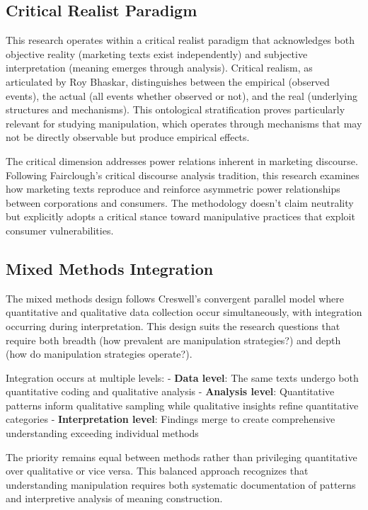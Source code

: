 \subsection{Critical Realist Paradigm}

This research operates within a critical realist paradigm that acknowledges both objective reality (marketing texts exist independently) and subjective interpretation (meaning emerges through analysis). Critical realism, as articulated by Roy Bhaskar, distinguishes between the empirical (observed events), the actual (all events whether observed or not), and the real (underlying structures and mechanisms). This ontological stratification proves particularly relevant for studying manipulation, which operates through mechanisms that may not be directly observable but produce empirical effects.

The critical dimension addresses power relations inherent in marketing discourse. Following Fairclough's critical discourse analysis tradition, this research examines how marketing texts reproduce and reinforce asymmetric power relationships between corporations and consumers. The methodology doesn't claim neutrality but explicitly adopts a critical stance toward manipulative practices that exploit consumer vulnerabilities.

\subsection{Mixed Methods Integration}

The mixed methods design follows Creswell's convergent parallel model where quantitative and qualitative data collection occur simultaneously, with integration occurring during interpretation. This design suits the research questions that require both breadth (how prevalent are manipulation strategies?) and depth (how do manipulation strategies operate?).

Integration occurs at multiple levels:
- \textbf{Data level}: The same texts undergo both quantitative coding and qualitative analysis
- \textbf{Analysis level}: Quantitative patterns inform qualitative sampling while qualitative insights refine quantitative categories
- \textbf{Interpretation level}: Findings merge to create comprehensive understanding exceeding individual methods

The priority remains equal between methods rather than privileging quantitative over qualitative or vice versa. This balanced approach recognizes that understanding manipulation requires both systematic documentation of patterns and interpretive analysis of meaning construction.

